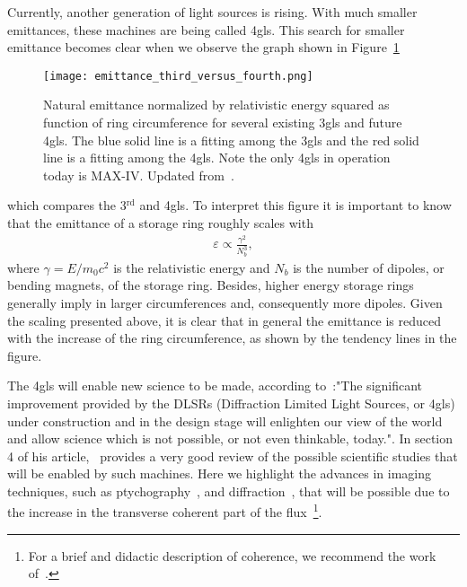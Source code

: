     Currently, another generation of light sources is rising. With much smaller emittances, these machines are being called \gls{4gls}.
    This search for smaller emittance becomes clear when we observe the graph shown in Figure~\ref{fig:scaled_emittances}
    \begin{figure}
        \center
        \texttt{[image: emittance\_third\_versus\_fourth.png]}
        \caption[Comparison of machines emittances.]{Natural emittance normalized by relativistic energy squared as function of ring circumference for several existing \gls{3gls} and future \gls{4gls}. The blue solid line is a fitting among the \gls{3gls} and the red solid line is a fitting among the \gls{4gls}. Note the only \gls{4gls} in operation today is MAX-IV. Updated from~\cite{Liu2017}.}
        \label{fig:scaled_emittances}
    \end{figure}
    which compares the 3$^\text{rd}$ and \gls{4gls}. To interpret this figure it is important to know that the emittance of a storage ring roughly scales with
    \begin{align}
        \varepsilon \propto \frac{\gamma^2}{N_b^3},
    \end{align}
    where $\gamma = E/m_0c^2$ is the relativistic energy and $N_b$ is the number of dipoles, or bending magnets, of the storage ring. Besides, higher energy storage rings generally imply in larger circumferences and, consequently more dipoles. Given the scaling presented above, it is clear that in general the emittance is reduced with the increase of the ring circumference, as shown by the tendency lines in the figure.

    The \gls{4gls} will enable new science to be made, according to~:"The significant improvement provided by the DLSRs (Diffraction Limited Light Sources, or \gls{4gls}) under construction and in the design stage will enlighten our view of the world and allow science which is not possible, or not even thinkable, today.". In section 4 of his article,~\citeauthor{Eriksson2014} provides a very good review of the possible scientific studies that will be enabled by such machines. Here we highlight the advances in imaging techniques, such as ptychography~\cite{Thibault2014}, and diffraction~\cite{Hitchcock2014}, that will be possible due to the increase in the transverse coherent part of the flux~\footnote{For a brief and didactic description of coherence, we recommend the work of~.}.

